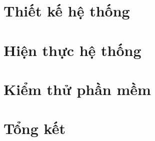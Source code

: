 \documentclass[a4paper, twoside, 12pt]{report}
\theoremstyle{definition}
\begin{document}

\chapter{Thiết kế hệ thống}


\newpage


\newpage


\newpage


\newpage





\chapter{Hiện thực hệ thống}


\newpage



\newpage


\newpage



\chapter{Kiểm thử phần mềm}



\chapter{Tổng kết}







\end{document}

